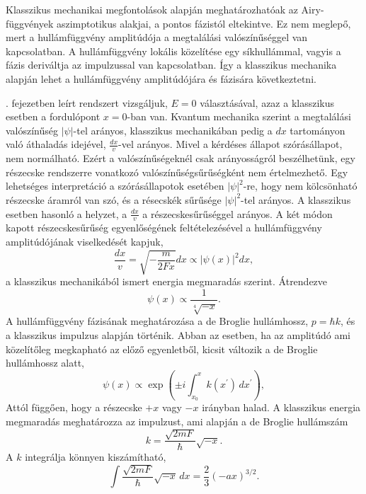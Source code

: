 Klasszikus mechanikai megfontolások alapján meghatározhatóak az Airy-függvények aszimptotikus alakjai, a pontos fázistól eltekintve. Ez nem meglepő, mert a hullámfüggvény amplitúdója a megtalálási valószínűséggel van kapcsolatban. A hullámfüggvény lokális közelítése egy síkhullámmal, vagyis a fázis deriváltja az impulzussal van kapcsolatban. Így a klasszikus mechanika alapján lehet a hullámfüggvény amplitúdójára és fázisára következtetni.

. fejezetben leírt rendszert vizsgáljuk, $E=0$ választásával, azaz a klasszikus esetben a fordulópont $x=0$-ban van. Kvantum mechanika szerint a megtalálási valószínűség $|\psi|$-tel arányos, klasszikus mechanikában pedig a $dx$ tartományon való áthaladás idejével, $\frac{dx}{v}$-vel arányos. Mivel a kérdéses állapot szórásállapot, nem normálható. Ezért a valószínűségeknél csak arányosságról beszélhetünk, egy részecske rendszerre vonatkozó valószínűségsűrűségként nem értelmezhető. Egy lehetséges interpretáció a szórásállapotok esetében $|\psi|^2$-re, hogy nem kölcsönható részecske áramról van szó, és a résecskék sűrűsége $|\psi|^2$-tel arányos. A klasszikus esetben hasonló a helyzet, a $\frac{dx}{v}$ a részecskesűrűséggel arányos. A két módon kapott részecskesűrűség egyenlőségének feltételezésével a hullámfüggvény amplitúdójának viselkedését kapjuk,
\begin{equation}
	\frac{dx}{v}=\sqrt{-\frac{m}{2Fx}}dx\propto \lvert\psi(x)\rvert^2dx,
\end{equation}
a klasszikus mechanikából ismert energia megmaradás szerint. Átrendezve
\begin{equation}
	\psi(x)\propto\frac{1}{\sqrt[4]{-x}}.
\end{equation}
A hullámfüggvény fázisának meghatározása a de Broglie hullámhossz, $p=\hbar k$, és a klasszikus impulzus alapján történik. Abban az esetben, ha az amplitúdó ami közelítőleg megkapható az előző egyenletből, kicsit változik a de Broglie hullámhossz alatt,
\begin{equation}
	\psi(x)\propto\exp\left(\pm i\int_{x_0}^xk\left(x^\prime\right)\,dx^\prime\right),
	\label{asymtotics:phase}
\end{equation}
Attól függően, hogy a részecske $+x$ vagy $-x$ irányban halad. A klasszikus energia megmaradás meghatározza az impulzust, ami alapján a de Broglie hullámszám
\begin{equation}
	k=\frac{\sqrt{2mF}}{\hbar}\sqrt{-x}.
\end{equation}
A $k$ integrálja könnyen kiszámítható,
\begin{equation}
	\int \frac{\sqrt{2mF}}{\hbar}\sqrt{-x}\,dx=\frac{2}{3}\left(-ax\right)^{3/2}.
\end{equation}
